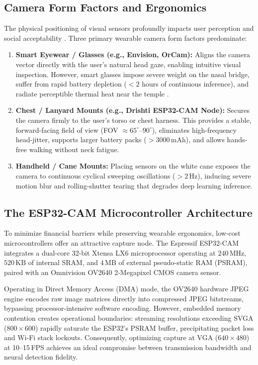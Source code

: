 \documentclass[10pt,twocolumn]{article}
\begin{document}
\subsection{Camera Form Factors and Ergonomics}
The physical positioning of visual sensors profoundly impacts user perception and social acceptability \cite{profita2013don}. Three primary wearable camera form factors predominate:
\begin{enumerate}[leftmargin=*]
    \item \textbf{Smart Eyewear / Glasses (e.g., Envision, OrCam):} Aligns the camera vector directly with the user's natural head gaze, enabling intuitive visual inspection. However, smart glasses impose severe weight on the nasal bridge, suffer from rapid battery depletion ($<2$ hours of continuous inference), and radiate perceptible thermal heat near the temple \cite{mann2001wearable}.
    \item \textbf{Chest / Lanyard Mounts (e.g., Drishti ESP32-CAM Node):} Secures the camera firmly to the user's torso or chest harness. This provides a stable, forward-facing field of view (FOV $\approx 65^\circ$--$90^\circ$), eliminates high-frequency head-jitter, supports larger battery packs ($>3000\,\text{mAh}$), and allows hands-free walking without neck fatigue.
    \item \textbf{Handheld / Cane Mounts:} Placing sensors on the white cane exposes the camera to continuous cyclical sweeping oscillations ($>2\,\text{Hz}$), inducing severe motion blur and rolling-shutter tearing that degrades deep learning inference.
\end{enumerate}

\subsection{The ESP32-CAM Microcontroller Architecture}
To minimize financial barriers while preserving wearable ergonomics, low-cost microcontrollers offer an attractive capture node. The Espressif ESP32-CAM integrates a dual-core 32-bit Xtensa LX6 microprocessor operating at $240\,\text{MHz}$, $520\,\text{KB}$ of internal SRAM, and $4\,\text{MB}$ of external pseudo-static RAM (PSRAM), paired with an Omnivision OV2640 2-Megapixel CMOS camera sensor.

Operating in Direct Memory Access (DMA) mode, the OV2640 hardware JPEG engine encodes raw image matrices directly into compressed JPEG bitstreams, bypassing processor-intensive software encoding. However, embedded memory contention creates operational boundaries: streaming resolutions exceeding SVGA ($800 \times 600$) rapidly saturate the ESP32's PSRAM buffer, precipitating packet loss and Wi-Fi stack lockouts. Consequently, optimizing capture at VGA ($640 \times 480$) at 10--15\,FPS achieves an ideal compromise between transmission bandwidth and neural detection fidelity.
\end{document}
